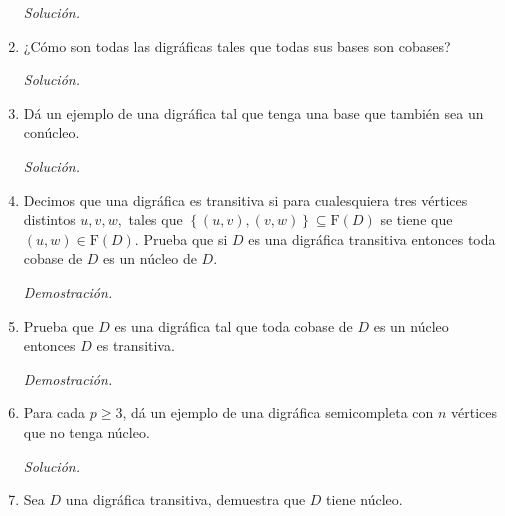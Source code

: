 \documentclass[12pt, fleqn]{article}
\newcommand{\F}[1]{\mathrm{F} \! \left( #1 \right)}
\begin{document}
\begin{enumerate}
		\emph{Solución.}

		
		
		\item ¿Cómo son todas las digráficas tales que todas sus bases son cobases?
		
		\emph{Solución.}

		
		
		\item Dá un ejemplo de una digráfica tal que tenga una base que también sea un conúcleo.
		
		\emph{Solución.}

		
		
		\item Decimos que una digráfica es transitiva si para cualesquiera tres vértices distintos $ u, v, w, $ tales que $ \left\lbrace (u, v), (v,w) \right\rbrace \subseteq \F{D} $ se tiene que $ (u,w) \in \F{D} $. Prueba que si $D$ es una digráfica transitiva entonces toda cobase de $D$ es un núcleo de $D$.
		
		\emph{Demostración.}

		
		
		\item Prueba que $D$ es una digráfica tal que toda cobase de $D$ es un núcleo entonces $D$ es transitiva.
		
		\emph{Demostración.}

		
		
		\item Para cada $ p \geq 3 $, dá un ejemplo de una digráfica semicompleta con $n$ vértices que no tenga núcleo.
		
		\emph{Solución.}

		
		
		\item Sea $D$ una digráfica transitiva, demuestra que $D$ tiene núcleo.
		

\end{enumerate}
\end{document}
